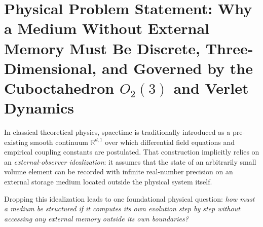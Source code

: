 \documentclass[11pt,a4paper]{article}
\theoremstyle{plain}
\theoremstyle{definition}
\begin{document}
\begin{abstract}
\medskip\noindent
\textbf{Keywords:} discrete Planckian carrier, model-theoretic algebraic systems, Catalan equation $1+2^d=d^2$, cuboctahedron $O_2(3)$, symplectic Verlet automaton, Born's rule, fine-structure constant, Lean~4.
\end{abstract}

\section{Physical Problem Statement: Why a Medium Without External Memory Must Be Discrete, Three-Dimensional, and Governed by the Cuboctahedron \texorpdfstring{$O_2(3)$}{O2(3)} and Verlet Dynamics}
\label{sec:axioms-uniqueness}

In classical theoretical physics, spacetime is traditionally introduced as a pre-existing smooth continuum $\mathbb{R}^{d,1}$ over which differential field equations and empirical coupling constants are postulated. That construction implicitly relies on an \emph{external-observer idealization}: it assumes that the state of an arbitrarily small volume element can be recorded with infinite real-number precision on an external storage medium located outside the physical system itself.

Dropping this idealization leads to one foundational physical question: \emph{how must a medium be structured if it computes its own evolution step by step without accessing any external memory outside its own boundaries?}
\end{document}
